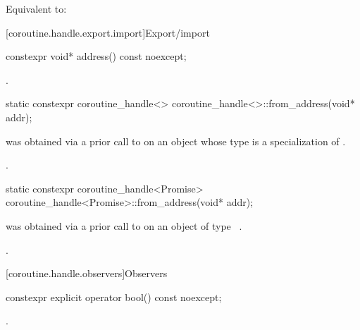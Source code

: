 \begin{itemdescr}
\pnum
\effects
Equivalent to: 
\end{itemdescr}

[coroutine.handle.export.import]{Export/import}

%
\begin{itemdecl}
constexpr void* address() const noexcept;
\end{itemdecl}

\begin{itemdescr}
\pnum
\returns
{}.
\end{itemdescr}

%
\begin{itemdecl}
static constexpr coroutine_handle<> coroutine_handle<>::from_address(void* addr);
\end{itemdecl}

\begin{itemdescr}
\pnum
\expects
{} was obtained via a prior call to 
on an object whose type is a specialization of .

\pnum
\ensures
{}.
\end{itemdescr}

%
\begin{itemdecl}
static constexpr coroutine_handle<Promise> coroutine_handle<Promise>::from_address(void* addr);
\end{itemdecl}

\begin{itemdescr}
\pnum
\expects
{} was obtained via a prior call to 
on an object of type \cv{}~.

\pnum
\ensures
{}.
\end{itemdescr}

[coroutine.handle.observers]{Observers}

%
\begin{itemdecl}
constexpr explicit operator bool() const noexcept;
\end{itemdecl}

\begin{itemdescr}
\pnum
\returns
{}.
\end{itemdescr}

